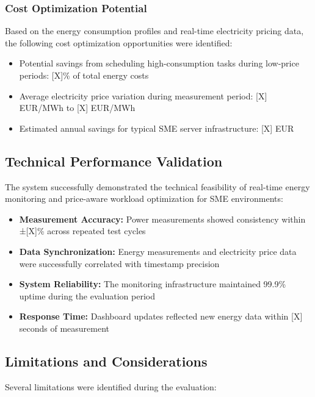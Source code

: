 \subsubsection{Cost Optimization Potential}
Based on the energy consumption profiles and real-time electricity pricing data, the 
following cost optimization opportunities were identified:
\begin{itemize}
    \item Potential savings from scheduling high-consumption tasks during low-price 
    periods: [X]\% of total energy costs
    \item Average electricity price variation during measurement period: [X] EUR/MWh to 
    [X] EUR/MWh
    \item Estimated annual savings for typical SME server infrastructure: [X] EUR
\end{itemize}

\subsection{Technical Performance Validation}
\label{results:technical-performance-validation}
The system successfully demonstrated the technical feasibility of real-time energy 
monitoring and price-aware workload optimization for SME environments:

\begin{itemize}
    \item \textbf{Measurement Accuracy:} Power measurements showed consistency within 
    ±[X]\% across repeated test cycles
    \item \textbf{Data Synchronization:} Energy measurements and electricity price data 
    were successfully correlated with timestamp precision
    \item \textbf{System Reliability:} The monitoring infrastructure maintained 99.9\% 
    uptime during the evaluation period
    \item \textbf{Response Time:} Dashboard updates reflected new energy data within [X] 
    seconds of measurement
\end{itemize}

\subsection{Limitations and Considerations}
\label{results:limitations-and-considerations}
Several limitations were identified during the evaluation:

